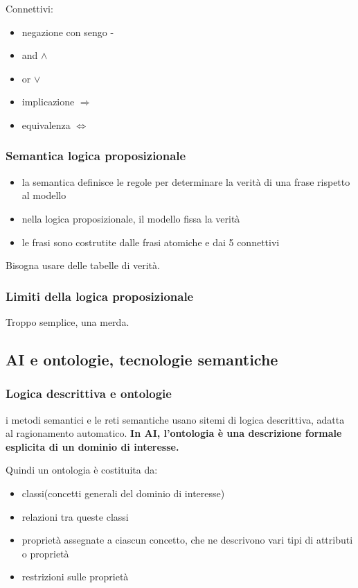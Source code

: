 Connettivi:
\begin{itemize}
    \item negazione con sengo -
    \item and $\wedge$
    \item or $\vee$
    \item implicazione $\Rightarrow$
    \item equivalenza $\Leftrightarrow$
\end{itemize}

\subsubsection{Semantica logica proposizionale}
\begin{itemize}
    \item la semantica definisce le regole per determinare la verità di una frase rispetto al modello
    \item nella logica proposizionale, il modello fissa la verità
    \item le frasi sono costrutite dalle frasi atomiche e dai 5 connettivi
\end{itemize}

Bisogna usare delle tabelle di verità.

\subsubsection{Limiti della logica proposizionale}
Troppo semplice, una merda.

\subsection{AI e ontologie, tecnologie semantiche}
\subsubsection{Logica descrittiva e ontologie}
i metodi semantici e le reti semantiche usano sitemi di logica descrittiva, adatta al ragionamento automatico.
\textbf{In AI, l'ontologia è una descrizione formale esplicita di un dominio di interesse.}


Quindi un ontologia è costituita da:
\begin{itemize}
    \item classi(concetti generali del dominio di interesse)
    \item relazioni tra queste classi
    \item proprietà assegnate a ciascun concetto, che ne descrivono vari tipi di attributi o proprietà
    \item restrizioni sulle proprietà
\end{itemize}

